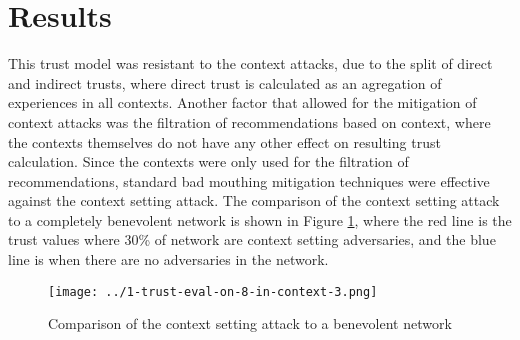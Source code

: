 \documentclass{article}
\begin{document}
    \section{Results}
    This trust model was resistant to the context attacks, due to the split of direct and
    indirect trusts, where direct trust is calculated as an agregation of
    experiences in all contexts. Another factor that allowed for the mitigation
    of context attacks was the filtration of recommendations based on context,
    where the contexts themselves do not have any other effect on resulting
    trust calculation. Since the contexts were only used for the filtration of
    recommendations, standard bad mouthing mitigation techniques were effective
    against the context setting attack. The comparison of the context setting
    attack to a completely benevolent network is shown in Figure \ref{fig:trust_plot}, where the red
    line is the trust values where 30\% of network are context setting adversaries, and
    the blue line is when there are no adversaries in the network.

    \begin{figure}[H]
        \centering
        \texttt{[image: ../1-trust-eval-on-8-in-context-3.png]}
        \caption{Comparison of the context setting attack to a benevolent network}
        \label{fig:trust_plot}
    \end{figure}


    
    
\end{document}
